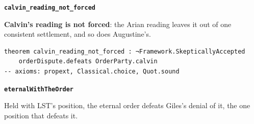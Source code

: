 \documentclass[11pt,paper=\testimonypaper,DIV=13,parskip=false]{scrartcl}
\begin{document}
\par\medskip\noindent\textbf{\texttt{calvin\_\allowbreak{}reading\_\allowbreak{}not\_\allowbreak{}forced}}\par\nobreak\noindent
\textbf{Calvin’s reading is not forced}: the Arian reading leaves it out of one consistent settlement, and so does Augustine’s.

{\small\begin{verbatim}
theorem calvin_reading_not_forced : ¬Framework.SkepticallyAccepted
    orderDispute.defeats OrderParty.calvin
-- axioms: propext, Classical.choice, Quot.sound
\end{verbatim}}
\par\medskip\noindent\textbf{\texttt{eternal\allowbreak{}With\allowbreak{}The\allowbreak{}Order}}\par\nobreak\noindent
Held with LST’s position, the eternal order defeats Giles’s denial of it, the one position that defeats it.
\end{document}
